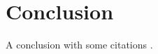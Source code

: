 \chapter{Conclusion}
A conclusion with some citations \cite{kingma_auto-encoding_2014,rezende_stochastic_2014}.

